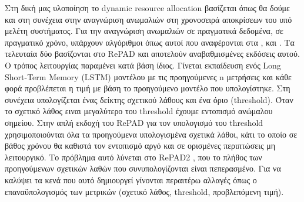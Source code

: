 Στη δική μας υλοποίηση το dynamic resource allocation βασίζεται όπως θα δούμε και στη συνέχεια στην αναγνώριση ανωμαλιών στη χρονοσειρά αποκρίσεων του υπό μελέτη συστήματος. Για την αναγνώριση ανωμαλιών σε πραγματικά δεδομένα, σε πραγματικό χρόνο, υπάρχουν αλγόριθμοι όπως αυτοί που αναφέρονται στα \cite{repad}, \cite{lee2023repad2} και \cite{rerepad}. Τα τελευταία δύο βασίζονται στο RePAD \cite{repad} και αποτελούν αναβαθμισμένες εκδόσεις αυτού. Ο τρόπος λειτουργίας παραμένει κατά βάση ίδιος. Γίνεται εκπαίδευση ενός Long Short-Term Memory (LSTM) μοντέλου με τις προηγούμενες n μετρήσεις και κάθε φορά προβλέπεται η τιμή με βάση το προηγούμενο μοντέλο που υπολογίστηκε. Στη συνέχεια υπολογίζεται ένας δείκτης σχετικού λάθους και ένα όριο (threshold). Όταν το σχετικό λάθος ειναι μεγαλύτερο του threshold έχουμε εντοπισμό ανώμαλου σημείου. Στην απλή εκδοχή του RePAD για τον υπολογισμό του threshold χρησιμοποιούνται όλα τα προηγούμενα υπολογισμένα σχετικά λάθοι, κάτι το οποίο σε βάθος χρόνου θα καθιστά τον εντοπισμό αργό και σε ορισμένες περιπτώσεις μη λειτουργικό. Το πρόβλημα αυτό λύνεται στο RePAD2 \cite{lee2023repad2}, που το πλήθος των προηγούμενων σχετικών λαθών που συνυπολογίζονται είναι πεπερασμένο. Για να καλύψει τα κενά που αυτό δημιουργεί γίνονται περαιτέρω αλλαγές όπως ο επαναϋπολογισμός των μετρικών (σχετικό λάθος, threshold, προβλεπόμενη τιμή).

